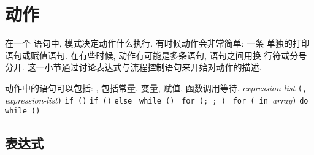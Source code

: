 \section{动作}
\label{sec:actions}

在一个 \patact 语句中, 模式决定动作什么执行. 有时候动作会非常简单: 一条 
单独的打印语句或赋值语句. 在有些时候, 动作有可能是多条语句, 语句之间用换
行符或分号分开. 这一小节通过讨论表达式与流程控制语句来开始对动作的描述.
\begin{summary}
    动作中的语句可以包括:
    \expr, 包括常量, 变量, 赋值, 函数调用等待.
    \print \textit{expression-list}
    \printf\verb'('\fmt\verb', '\textit{expression-list}\verb')'
    \verb'if ('\expr\verb')' \stmt
    \verb'if ('\expr\verb')' \stmt \verb'else '\stmt
    \verb'while ('\expr\verb') '\stmt
    \verb'for ('\expr\verb'; '\expr\verb'; '\expr\verb') '\stmt
    \verb'for ('\expr\verb' in '\textit{array}\verb')' \stmt
    \verb'do '\stmt \verb'while ('\expr\verb')'
    \break
    \ctn
\end{summary}

\subsection{表达式}
\label{subsec:expressions}
